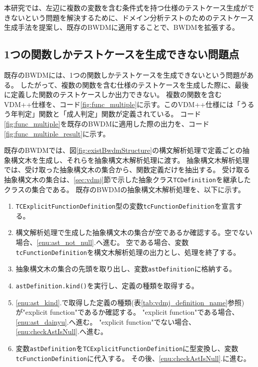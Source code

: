 \documentclass[uplatex, report, a4j, 10pt]{jsbook}
\newcommand\ttt[1]{\texttt{#1}}
\newcommand{\tool}{BWDM}
\begin{document}
本研究では、左辺に複数の変数を含む条件式を持つ仕様のテストケース生成ができないという問題を解決するために、ドメイン分析テストのためのテストケース生成手法を提案し、既存のBWDMに適用することで、BWDMを拡張する。

\subsection{1つの関数しかテストケースを生成できない問題点}\label{sec:probrem_only_function}
既存の\tool{}には、1つの関数しかテストケースを生成できないという問題がある。
したがって、複数の関数を含む仕様のテストケースを生成した際に、最後に定義した関数のテストケースしか出力できない。
複数の関数を含むVDM++仕様を、コード\ref{fig:func_multiple}に示す。このVDM++仕様には「うるう年判定」関数と「成人判定」関数が定義されている。
コード\ref{fig:func_multiple}を既存のBWDMに適用した際の出力を、コード\ref{fig:func_multiple_result}に示す。

既存のBWDMでは、図\ref{fig:existBwdmStructure}の構文解析処理で定義ごとの抽象構文木を生成し、それらを抽象構文木解析処理に渡す。
抽象構文木解析処理では、受け取った抽象構文木の集合から、関数定義だけを抽出する。
受け取る抽象構文木の集合は、\ref{sec:vdmj}節で示した抽象クラス\ttt{TCDefinition}を継承したクラスの集合である。
既存のBWDMの抽象構文木解析処理を、以下に示す。

\newcommand{\TCExplicitFunctionDefinition}{\ttt{TCExplicitFunctionDefinition}}
\newcommand{\tcFunctionDefinition}{\ttt{tcFunctionDefinition}}
\newcommand{\astDefinition}{\ttt{astDefinition}}

\begin{enumerate}
  \item \TCExplicitFunctionDefinition{}型の変数\tcFunctionDefinition{}を宣言する。
  \item\label{enu:checkAstIsNull} 構文解析処理で生成した抽象構文木の集合が空であるか確認する。空でない場合、\ref{enu:ast_not_null}.へ進む。
        空である場合、変数\tcFunctionDefinition{}を構文木解析処理の出力とし、処理を終了する。
  \item\label{enu:ast_not_null} 抽象構文木の集合の先頭を取り出し、変数\astDefinition{}に格納する。
  \item\label{enu:ast_kind} \astDefinition{}\ttt{.kind()}を実行し、定義の種類を取得する。
  \item \ref{enu:ast_kind}.で取得した定義の種類(表\ref{tab:vdmj_definition_name}参照)が"explicit function"であるか確認する。
        "explicit function"である場合、\ref{enu:ast_dainyu}.へ進む。
        "explicit function"でない場合、\ref{enu:checkAstIsNull}.へ進む。
  \item\label{enu:ast_dainyu} 変数\astDefinition{}を\TCExplicitFunctionDefinition{}に型変換し、変数\tcFunctionDefinition{}に代入する。
        その後、\ref{enu:checkAstIsNull}.に進む。
\end{enumerate}
\end{document}
